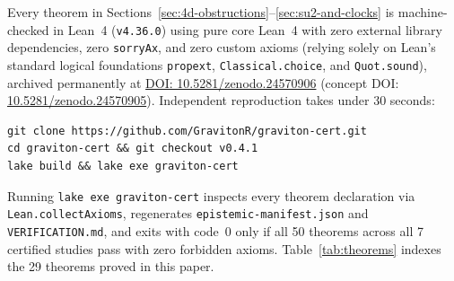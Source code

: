 \documentclass[11pt,a4paper]{article}
\theoremstyle{plain}
\theoremstyle{remark}
\newcommand{\code}[1]{\texttt{\small #1}}
\begin{document}
Every theorem in Sections~\ref{sec:4d-obstructions}--\ref{sec:su2-and-clocks} is machine-checked in Lean~4 (\code{v4.36.0}) using pure core Lean~4 with zero external library dependencies, zero \code{sorryAx}, and zero custom axioms (relying solely on Lean's standard logical foundations \code{propext}, \code{Classical.choice}, and \code{Quot.sound}), archived permanently at \href{https://doi.org/10.5281/zenodo.24570906}{DOI: 10.5281/zenodo.24570906} (concept DOI: \href{https://doi.org/10.5281/zenodo.24570905}{10.5281/zenodo.24570905}). Independent reproduction takes under 30 seconds:
\begin{verbatim}
git clone https://github.com/GravitonR/graviton-cert.git
cd graviton-cert && git checkout v0.4.1
lake build && lake exe graviton-cert
\end{verbatim}
Running \code{lake exe graviton-cert} inspects every theorem declaration via \code{Lean.collectAxioms}, regenerates \code{epistemic-manifest.json} and \code{VERIFICATION.md}, and exits with code~0 only if all 50 theorems across all 7 certified studies pass with zero forbidden axioms. Table~\ref{tab:theorems} indexes the 29 theorems proved in this paper.
\end{document}

